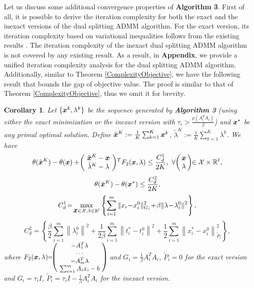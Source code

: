\documentclass{mcom-l}
\newtheorem{corollary}[theorem]{Corollary}
\theoremstyle{definition}
\theoremstyle{remark}
\numberwithin{equation}{section}
\begin{document}
{Let us discuss some additional convergence properties of {\bf Algorithm 3}. First of all, it is possible to derive the iteration complexity for both the exact and the inexact versions of the dual splitting ADMM algorithm. For the exact version, its iteration complexity based on variational inequalities follows from the existing results \cite{HeYuan2012}. The iteration complexity of the inexact dual splitting ADMM algorithm is not covered by any existing result. As a result, in {\bf{Appendix}}, we provide a unified iteration complexity analysis for the dual splitting ADMM algorithm. Additionally, similar to Theorem \ref{ComplexityObjective}, we have the following result that bounds the gap of objective value. The proof is similar to that of Theorem \ref{ComplexityObjective}, thus we omit it for brevity.
\begin{corollary}\label{corComplexity}
Let $\{{{\mbox{\boldmath $x$}}}^k,\lambda^k\}$ be the sequence generated by {\bf{Algorithm 3}} (using either the exact minimization or the inexact version with $\tau_i > \frac{\rho (A_i^T A_i)}{\beta}$) and ${{\mbox{\boldmath $x$}}}^*$ be any primal optimal solution. Define $\tilde{{\mbox{\boldmath $x$}}}^K := \frac{1}{K} \sum_{k=1}^K {{\mbox{\boldmath $x$}}}^k$, $\tilde{\lambda}^K := \frac{1}{K} \sum_{k=1}^K \lambda^k$. We have
\begin{equation}\label{Iterationcomplexity3}
\theta(\tilde{\mbox{\boldmath$x$}}^K) - \theta(\mbox{\boldmath$x$})
+ \!\left(\!\begin{array}{c}\tilde{{\mbox{\boldmath $x$}}}^K - \mbox{\boldmath$x$}\\ \tilde{\lambda}^K - \lambda \end{array}\!\right)\!^T
F_2({{\mbox{\boldmath $x$}}},\lambda)\le \frac{C_d^1}{2K},\ \forall \!\left(\!\!\begin{array}{c} \mbox{\boldmath$x$}\\  \lambda \end{array}\!\!\right)\!\!\in {\mathcal{X}}\times{\mathbb{R}}^{\ell},
\end{equation}
$$
\theta(\tilde{{\mbox{\boldmath $x$}}}^K) - \theta({{\mbox{\boldmath $x$}}}^*)\le \frac{C_d^2}{2K},
$$
$$
C_d^1 \!=\! \max\limits_{ {{\mbox{\boldmath $x$}}}\in {\mathcal{X}},\lambda\in {\mathbb{R}}^l} \left\{ \sum\limits_{i=1}^m \| x_i \!-\! x_i^0 \|_{G_i}^2 \!+\! \beta \| \lambda \!-\! \lambda_i^0 \|^2 \right\},
$$
$$
C_d^2 \!=\! \left\{ \frac{\beta}{2} \sum_{i=1}^m \left\| \lambda_i^0 \right\|^2 \!+\! \frac{1}{2\beta}\sum_{i=1}^m \left\| t_i^* \!-\! t_i^0 \right\|^2 \!+\! \frac{1}{2}\sum_{i=1}^m \left\| x_i^* \!-\! x_i^0 \right\|_{\tilde{P}_i}^2 \right\},
$$
where $F_2 ({{\mbox{\boldmath $x$}}},\lambda) \!\!=\!\! {\small \!\left(\!\begin{array}{c} -A_1^T \lambda\\ \cdots \\ -A_m^T \lambda\\ \sum_{i=1}^m A_i x_i - b \end{array}\!\right)\!}$ and $G_i \!=\! \frac{1}{\beta} A_i^T A_i$, $\tilde{P}_i = 0$ for the exact version and $G_i \!=\! \tau_i I$, $\tilde{P}_i = \tau_i I - \frac{1}{\beta}A_i^T A_i$ for the inexact version.
\end{corollary}

}
\end{document}
